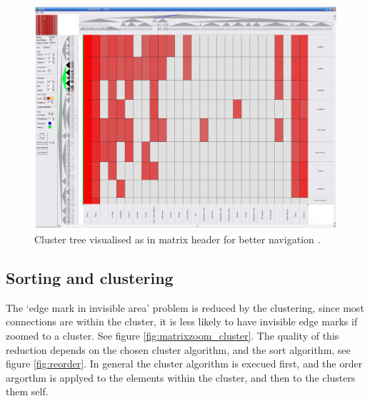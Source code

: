\begin{figure}[h]
\centering
\includegraphics[width=\textwidth]{images/matrixzoom_abello}
\caption{Cluster tree visualised as in matrix header for better navigation \citep{abello2004}. \label{fig:matrixzoom_abello}}
\end{figure}





\subsection{Sorting and clustering}   

The ‘edge mark in invisible area' problem is reduced by the clustering, since most connections are within the cluster, it is less likely to have invisible edge marks if zoomed to a cluster. See figure \ref{fig:matrixzoom_cluster}. 
The quality of this reduction depends on the chosen cluster algorithm, and the sort algorithm, see figure \ref{fig:reorder}. In general the cluster algorithm is execued first, and the order argorthm is applyed to the elements within the cluster, and then to the clusters them self.

